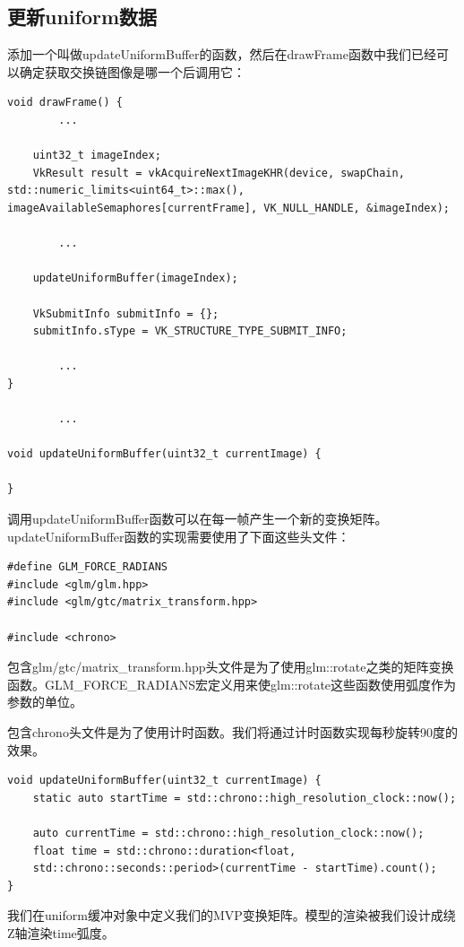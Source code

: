 \documentclass{ctexart}
\begin{document}
\subsection{更新uniform数据}

添加一个叫做updateUniformBuffer的函数，然后在drawFrame函数中我们已经可以确定获取交换链图像是哪一个后调用它：

\begin{lstlisting}[language={[ANSI]C}]
void drawFrame() {
		...

	uint32_t imageIndex;
	VkResult result = vkAcquireNextImageKHR(device, swapChain, std::numeric_limits<uint64_t>::max(), imageAvailableSemaphores[currentFrame], VK_NULL_HANDLE, &imageIndex);

		...

	updateUniformBuffer(imageIndex);

	VkSubmitInfo submitInfo = {};
	submitInfo.sType = VK_STRUCTURE_TYPE_SUBMIT_INFO;

		...
}

		...

void updateUniformBuffer(uint32_t currentImage) {

}
\end{lstlisting}

调用updateUniformBuffer函数可以在每一帧产生一个新的变换矩阵。updateUniformBuffer函数的实现需要使用了下面这些头文件：

\begin{lstlisting}[language={[ANSI]C}]
#define GLM_FORCE_RADIANS
#include <glm/glm.hpp>
#include <glm/gtc/matrix_transform.hpp>

#include <chrono>
\end{lstlisting}

包含glm/gtc/matrix\_transform.hpp头文件是为了使用glm::rotate之类的矩阵变换函数。GLM\_FORCE\_RADIANS宏定义用来使glm::rotate这些函数使用弧度作为参数的单位。

包含chrono头文件是为了使用计时函数。我们将通过计时函数实现每秒旋转90度的效果。

\begin{lstlisting}[language={[ANSI]C}]
void updateUniformBuffer(uint32_t currentImage) {
	static auto startTime = std::chrono::high_resolution_clock::now();

	auto currentTime = std::chrono::high_resolution_clock::now();
	float time = std::chrono::duration<float,
	std::chrono::seconds::period>(currentTime - startTime).count();
}
\end{lstlisting}

我们在uniform缓冲对象中定义我们的MVP变换矩阵。模型的渲染被我们设计成绕Z轴渲染time弧度。
\end{document}

